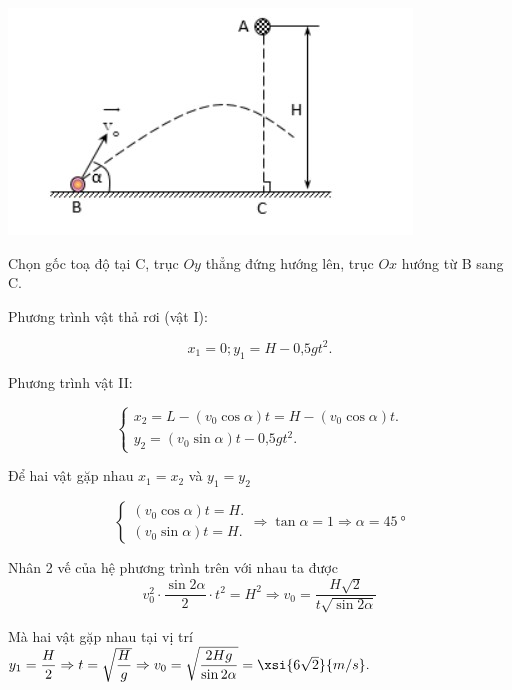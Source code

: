 \begin{enumerate}[label=\bfseries Bài \arabic*:]
{	\begin{center}
		\includegraphics[scale=1]{../figs/VN10-2021-PH-TP014-1.jpg}
	\end{center} 
}

\hideall
{	Chọn gốc toạ độ tại C, trục $Oy$ thẳng đứng hướng lên, trục $Ox$ hướng từ B sang C.
	
	Phương trình vật thả rơi (vật I):
	
	$$x_1 = 0; y_1 = H -\text{0,5}gt^2.$$
	
	Phương trình vật II:
	
	$$\begin{cases}
		x_2 = L  - (v_0 \cos \alpha)t = H - (v_0\cos \alpha)t.\\
		y_2 = (v_0\sin \alpha) t - \text{0,5}gt^2.
	\end{cases}$$
	
	Để hai vật gặp nhau $x_1 = x_2$ và $y_1 = y_2$
	
	$$\begin{cases}
		(v_0\cos \alpha) t = H.\\
		(v_0 \sin \alpha)t = H.
	\end{cases} \Rightarrow \tan \alpha = 1 \Rightarrow \alpha = \SI{45}{\degree}$$
	
	Nhân 2 vế của hệ phương trình trên với nhau ta được
	$$v^2_0\cdot\dfrac{\sin2\alpha}{2}\cdot t^2=H^2 \Rightarrow v_0=\dfrac{H\sqrt{2}}{t\sqrt{\sin2\alpha}}$$
	
	Mà hai vật gặp nhau tại vị trí $y_1=\dfrac{H}{2}\Rightarrow t=\sqrt{\dfrac{H}{g}}\Rightarrow v_0=\sqrt{\dfrac{2Hg}{\sin 2\alpha}} = \xsi{6\sqrt{2}}{m/s}.$
}
\end{enumerate}
